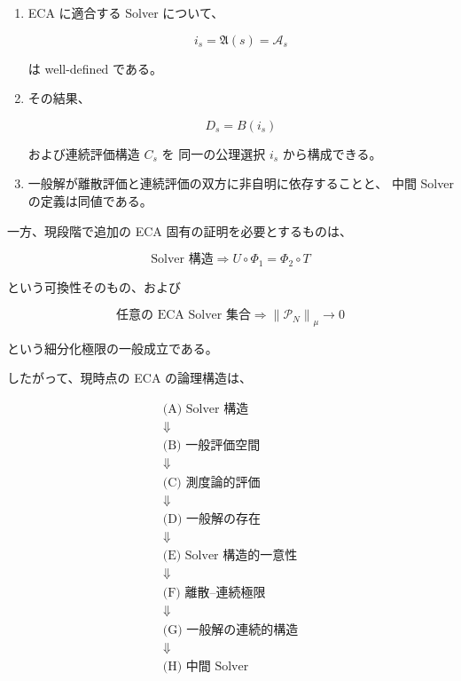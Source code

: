 \documentclass[a4paper,11pt]{article}
\newcommand{\Aset}{\mathcal{A}}
\begin{document}
\begin{enumerate}
が成立する。

\item
ECA に適合する Solver について、

\begin{equation}
    i_s
    =
    \mathfrak{A}(s)
    =
    \Aset_s
\end{equation}

は well-defined である。

\item
その結果、

\begin{equation}
    D_s=B(i_s)
\end{equation}

および連続評価構造 $C_s$ を
同一の公理選択 $i_s$ から構成できる。

\item
一般解が離散評価と連続評価の双方に非自明に依存することと、
中間 Solver の定義は同値である。

\end{enumerate}

一方、現段階で追加の ECA 固有の証明を必要とするものは、

\begin{equation}
    \boxed{
    \text{Solver 構造}
    \Longrightarrow
    U\circ\Phi_1=\Phi_2\circ T
    }
\end{equation}

という可換性そのもの、および

\begin{equation}
    \boxed{
    \text{任意の ECA Solver 集合}
    \Longrightarrow
    \left\|\mathcal{P}_N\right\|_\mu\to0
    }
\end{equation}

という細分化極限の一般成立である。

したがって、現時点の ECA の論理構造は、

\begin{equation}
\boxed{
\begin{array}{c}
\text{(A) Solver 構造}\\
\Downarrow\\
\text{(B) 一般評価空間}\\
\Downarrow\\
\text{(C) 測度論的評価}\\
\Downarrow\\
\text{(D) 一般解の存在}\\
\Downarrow\\
\text{(E) Solver 構造的一意性}\\
\Downarrow\\
\text{(F) 離散--連続極限}\\
\Downarrow\\
\text{(G) 一般解の連続的構造}\\
\Downarrow\\
\text{(H) 中間 Solver}
\end{array}
}
\end{equation}
\end{document}
